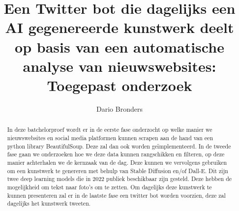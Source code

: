 \documentclass{hogent-article}
\title{Een Twitter bot die dagelijks een AI gegenereerde kunstwerk deelt op basis van een automatische analyse van nieuwswebsites: Toegepast onderzoek}
\author{Dario Bronders}
\begin{document}
\begin{abstract}
    In deze batchelorproef wordt er in de eerste fase onderzocht  op welke manier we nieuwswebsites en social media platformen kunnen scrapen aan de hand van een python library BeautifulSoup. Deze zal dan ook worden geïmplementeerd. In de tweede fase gaan we onderzoeken hoe we deze data kunnen rangschikken en filteren, op deze manier achterhalen we de kernzaak van de dag. Deze kunnen we vervolgens gebruiken om een kunstwerk te genereren met behulp van Stable Diffusion en/of Dall-E. Dit zijn twee deep learning models die in 2022 publiek beschikbaar zijn gesteld. Deze hebben de mogelijkheid om tekst naar foto's om te zetten. Om dagelijks deze kunstwerk te kunnen presenteren zal er in de laatste fase een twitter bot worden voorzien, deze zal dagelijks het kunstwerk tweeten.
\end{abstract}

\tableofcontents



\printbibliography[heading=bibintoc]
\end{document}
